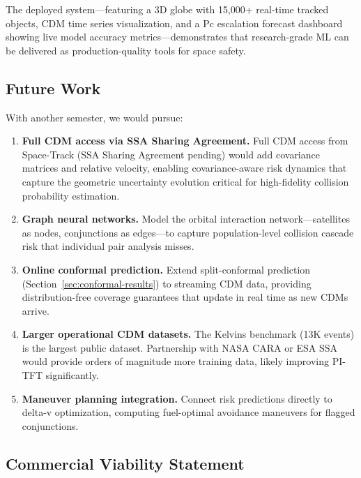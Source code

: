 \documentclass{article}
\begin{document}
The deployed system---featuring a 3D globe with 15,000+ real-time tracked objects, CDM time series visualization, and a Pc escalation forecast dashboard showing live model accuracy metrics---demonstrates that research-grade ML can be delivered as production-quality tools for space safety.

\subsection{Future Work}
\label{sec:future}

With another semester, we would pursue:

\begin{enumerate}
\item \textbf{Full CDM access via SSA Sharing Agreement.} Full CDM access from Space-Track (SSA Sharing Agreement pending) would add covariance matrices and relative velocity, enabling covariance-aware risk dynamics that capture the geometric uncertainty evolution critical for high-fidelity collision probability estimation.

\item \textbf{Graph neural networks.} Model the orbital interaction network---satellites as nodes, conjunctions as edges---to capture population-level collision cascade risk that individual pair analysis misses.

\item \textbf{Online conformal prediction.} Extend split-conformal prediction (Section~\ref{sec:conformal-results}) to streaming CDM data, providing distribution-free coverage guarantees that update in real time as new CDMs arrive.

\item \textbf{Larger operational CDM datasets.} The Kelvins benchmark (13K events) is the largest public dataset. Partnership with NASA CARA or ESA SSA would provide orders of magnitude more training data, likely improving PI-TFT significantly.

\item \textbf{Maneuver planning integration.} Connect risk predictions directly to delta-v optimization, computing fuel-optimal avoidance maneuvers for flagged conjunctions.
\end{enumerate}

\subsection{Commercial Viability Statement}
\label{sec:commercial}
\end{document}
